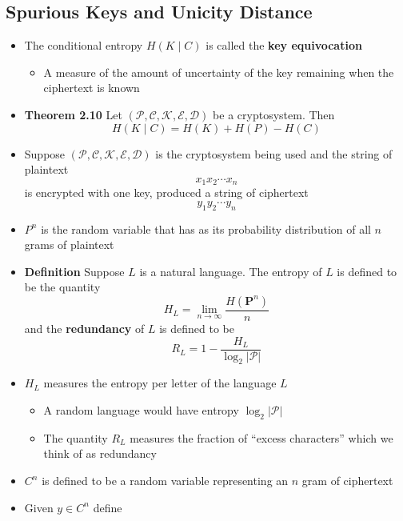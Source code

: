 \subsection{Spurious Keys and Unicity Distance}
\begin{itemize}
  \item The conditional entropy $H(K \mid C)$ is called the \textbf{key equivocation} 
  \begin{itemize}
  	\item A measure of the amount of uncertainty of the key remaining when the ciphertext is known
  \end{itemize}
  \item \textbf{Theorem 2.10} Let $(\mathcal P, \mathcal C, \mathcal K, \mathcal E, \mathcal D)$ be a cryptosystem. Then
  \begin{equation*}
    H(K \mid C) = H(K) + H(P) - H(C)
  \end{equation*} 
  \item Suppose $(\mathcal P, \mathcal C, \mathcal K, \mathcal E, \mathcal D)$ is the cryptosystem being used and the string of plaintext
  \begin{equation*}
    x_1x_2 \cdots x_n
  \end{equation*}
  is encrypted with one key, produced a string of ciphertext	
  \begin{equation*}
    y_1y_2 \cdots y_n
  \end{equation*}	
  \item $P^n$ is the random variable that has as its probability distribution of all $n$ grams of plaintext
  \item \textbf{Definition} Suppose $L$ is a natural language. The entropy of $L$ is defined to be the quantity
  $$
    H_{L}=\lim _{n \rightarrow \infty} \frac{H\left(\mathbf{P}^{n}\right)}{n}
  $$
  and the \textbf{redundancy} of $L$ is defined to be
  $$
    R_{L}=1-\frac{H_{L}}{\log _{2}|\mathcal{P}|}
  $$
  \item $H_L$ measures the entropy per letter of the language $L$
  \begin{itemize}
  	\item A random language would have entropy $\log_2 |\mathcal P|$
  	\item The quantity $R_L$ measures the fraction of ``excess characters'' which we think of as redundancy
  \end{itemize}
  \item $C^n$ is defined to be a random variable representing an $n$ gram of ciphertext
  \item Given $y \in C^n$ define

\end{itemize}

